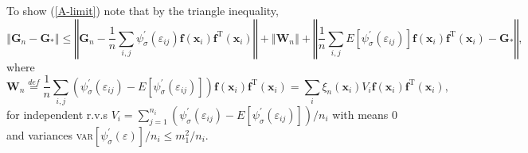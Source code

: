 \documentclass[times, authoryear, 12pt, twoside]{elsarticle}
\begin{document}
To show (\ref{A-limit}) note that by the triangle inequality,
\begin{equation}
\left\Vert \boldsymbol{G}_{n}-\boldsymbol{G}_{\ast }\right\Vert \leq
\left\Vert \boldsymbol{G}_{n}-\frac{1}{n}\sum_{i,j}\psi _{\sigma }^{\prime
}\left( \varepsilon _{ij}\right) \boldsymbol{f}\left( \boldsymbol{x}%
_{i}\right) \boldsymbol{f}^{{\mathrm{\scriptscriptstyle T}}}\left( 
\boldsymbol{x}_{i}\right) \right\Vert +\left\Vert \boldsymbol{W}%
_{n}\right\Vert +\left\Vert \frac{1}{n}\sum_{i,j}E\left[ \psi _{\sigma
}^{\prime }\left( \varepsilon _{ij}\right) \right] \boldsymbol{f}\left( 
\boldsymbol{x}_{i}\right) \boldsymbol{f}^{{\mathrm{\scriptscriptstyle T}}%
}\left( \boldsymbol{x}_{i}\right) -\boldsymbol{G}_{\ast }\right\Vert ,
\label{A-decomp}
\end{equation}%
where 
\begin{equation*}
\boldsymbol{W}_{n}\overset{def}{=}\frac{1}{n}\sum_{i,j}\left( \psi _{\sigma
}^{\prime }\left( \varepsilon _{ij}\right) -E\left[ \psi _{\sigma }^{\prime
}\left( \varepsilon _{ij}\right) \right] \right) \boldsymbol{f}\left( 
\boldsymbol{x}_{i}\right) \boldsymbol{f}^{{\mathrm{\scriptscriptstyle T}}%
}\left( \boldsymbol{x}_{i}\right) =\sum_{i}\xi _{n}\left( \boldsymbol{x}%
_{i}\right) V_{i}\boldsymbol{f}\left( \boldsymbol{x}_{i}\right) \boldsymbol{f%
}^{{\mathrm{\scriptscriptstyle T}}}\left( \boldsymbol{x}_{i}\right) ,
\end{equation*}%
for independent r.v.s $V_{i}=\sum_{j=1}^{n_{i}}\left( \psi _{\sigma
}^{\prime }\left( \varepsilon _{ij}\right) -E\left[ \psi _{\sigma }^{\prime
}\left( \varepsilon _{ij}\right) \right] \right) /n_{i}$ with means $0$ and
variances \textsc{var}$\left[ \psi _{\sigma }^{\prime }\left( \varepsilon
\right) \right] /n_{i}\leq m_{1}^{2}/n_{i}$.
\end{document}
